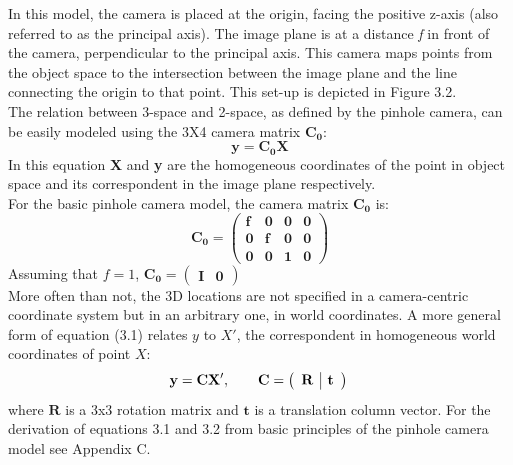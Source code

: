 \documentclass[12pt,a4paper,twoside,openright]{report}
\begin{document}
In this model, the camera is placed at the origin, facing the positive z-axis (also referred to as the principal axis). The image plane is at a distance \emph{f} in front of the camera, perpendicular to the principal axis. This camera maps points from the object space to the intersection between the image plane and the line connecting the origin to that point. This set-up is depicted in Figure 3.2.\\
\linebreak
The relation between 3-space and 2-space, as defined by the pinhole camera, can be easily modeled using the 3X4 camera matrix $\mathbf{C_{0}}$: 
\begin{equation}
\mathbf{y = C_{0}X}
\end{equation}
In this equation \textbf{X} and \textbf{y} are the homogeneous coordinates of the point in object space and its correspondent in the image plane respectively.\\
For the basic pinhole camera model, the camera matrix $\mathbf{C_{0}}$ is:
\[ \mathbf{C_{0}=\left(\begin{array}{cccc}
f & 0 & 0 & 0 \\
0 & f & 0 & 0 \\
0 & 0 & 1 & 0\end{array} \right)}\] 
Assuming that $f = 1$, $\mathbf{C_{0}} = \left ( \begin{array} {c|c} \mathbf{I} & \mathbf{0} \end{array} \right )$
\\
\linebreak
More often than not, the 3D locations are not specified in a camera-centric coordinate system but in an arbitrary one, in world coordinates. A more general form of equation (3.1) relates $y$ to $X'$, the correspondent in homogeneous world coordinates of point $X$:
\begin{equation}
\mathbf{y = CX'},\hspace{20pt} \mathbf{C} = \left ( \begin{array} {c|c} \mathbf{R} & \mathbf{t} \end{array} \right )\\
\end{equation} where $\mathbf{R}$ is a 3x3 rotation matrix and $\mathbf{t}$ is a translation column vector. For the derivation of equations 3.1 and 3.2 from basic principles of the pinhole camera model see Appendix C.\\
\end{document}
